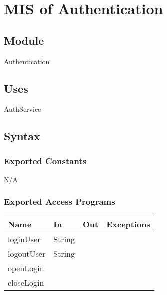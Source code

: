 \documentclass[12pt, titlepage]{article}
\begin{document}
	
	
	
	
	
	
	\section{MIS of Authentication} \label{Module} 
	
	\subsection{Module}
	Authentication
	
	\subsection{Uses}
	AuthService
	
	\subsection{Syntax}
	
	\subsubsection{Exported Constants}
	N/A
	
	\subsubsection{Exported Access Programs}
	
	\begin{center}
		\begin{tabular}{l  l  l  l}
			\hline
			\textbf{Name} & \textbf{In} & \textbf{Out} & \textbf{Exceptions} \\
			\hline
			loginUser & String & ~ & ~ \\
			\hline
			logoutUser & String & ~ & ~ \\
			\hline
			openLogin & ~ & ~ & ~ \\
			\hline
			closeLogin & ~ & ~ & ~ \\
			\hline
		\end{tabular}
	\end{center}
	
\end{document}
